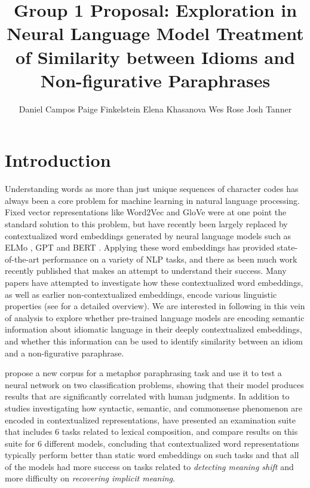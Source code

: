\documentclass[11pt,a4paper]{article}
\title{Group 1 Proposal: Exploration in  Neural Language Model Treatment of Similarity between Idioms and Non-figurative Paraphrases}
\author{Daniel Campos \And
  Paige Finkelstein \And 
    Elena Khasanova  \And
  Wes Rose  \And
  Josh Tanner   }
\begin{document}
\maketitle
\section{Introduction}
Understanding words as more than just unique sequences of character codes has always been a core problem for machine learning in natural language processing. Fixed vector representations like Word2Vec \cite{mikolov2013distributed} and GloVe \cite{Pennington2014GloveGV} were at one point the standard solution to this problem, but have recently been largely replaced by contextualized word embeddings generated by neural language models such as  ELMo \cite{Peters2018DeepCW}, GPT \cite{Radford2018ImprovingLU} and BERT \cite{devlin2018bert}. Applying these word embeddings has provided state-of-the-art performance on a variety of NLP tasks, and there as been much work recently published that makes an attempt to understand their success. Many papers have attempted to investigate how these contextualized word embeddings, as well as earlier non-contextualized embeddings, encode various linguistic properties (see \citet{Belinkov_2019} for a detailed overview). We are interested in following in this vein of analysis to explore whether pre-trained language models are encoding semantic information about idiomatic language in their deeply contextualized embeddings, and whether this information can be used to identify similarity between an idiom and a non-figurative paraphrase.

\citet{bizzoni-lappin-2018-predicting} propose a new corpus for a metaphor paraphrasing task and use it to test a neural network on two classification problems, showing that their model produces results that are significantly correlated with human judgments. In addition to studies investigating how syntactic, semantic, and commonsense \citep{zhou2019evaluating} phenomenon are encoded in contextualized representations, \citet{shwartz2019pain} have presented an examination suite that includes 6 tasks related to lexical composition, and compare results on this suite for 6 different models, concluding that contextualized word representations typically perform better than static word embeddings on such tasks and that all of the models had more success on tasks related to \textit{detecting meaning shift} and more difficulty on \textit{recovering implicit meaning}. 
\end{document}
